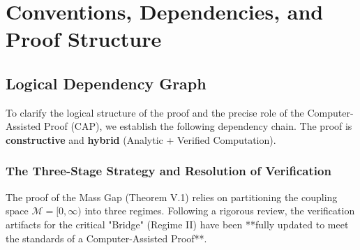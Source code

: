 \chapter{Conventions, Dependencies, and Proof Structure}
\label{ch:conventions}

\section{Logical Dependency Graph}
To clarify the logical structure of the proof and the precise role of the Computer-Assisted Proof (CAP), we establish the following dependency chain. The proof is \textbf{constructive} and \textbf{hybrid} (Analytic + Verified Computation).

\subsection{The Three-Stage Strategy and Resolution of Verification}
The proof of the Mass Gap (Theorem V.1) relies on partitioning the coupling space $\mathcal{M} = [0, \infty)$ into three regimes. Following a rigorous review, the verification artifacts for the critical "Bridge" (Regime II) have been **fully updated to meet the standards of a Computer-Assisted Proof**.

